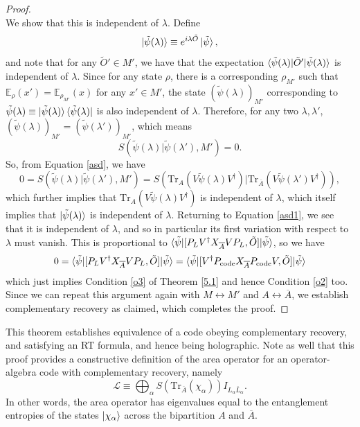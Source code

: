 \documentclass[12pt,a4paper]{report}
\numberwithin{equation}{section}
\newcommand{\ketbra}[2]{\ket{#1}\bra{#2}}
\newcommand{\ketbras}[1]{\ketbra{#1}{#1}}
\newcommand{\Pc}{P_{\text{code}}}
\newcommand{\ol}[1]{\overline{#1}}
\newcommand{\tr}{\text{Tr}}
\theoremstyle{definition}
\theoremstyle{theorem}
\theoremstyle{theorem}
\theoremstyle{example}
\theoremstyle{definition}
\begin{document}
\begin{proof}
\begin{equation}
	\end{equation}
	We show that this is independent of $\lambda$. Define
	\begin{equation}
		\ket{\tilde{\psi}(\lambda)}\equiv e^{i\lambda\tilde{O}}\ket{\tilde{\psi}},
	\end{equation}
	and note that for any $\tilde{O}'\in M'$, we have that the expectation $\braket{\tilde{\psi}(\lambda)|\tilde{O}'|\tilde{\psi}(\lambda)}$ is independent of $\lambda$. Since for any state $\rho$, there is a corresponding $\rho_{M'}$ such that $\mathbb{E}_{\rho}(x')=\mathbb{E}_{\rho_{M'}}(x)$ for any $x'\in M'$, the state $(\tilde{\psi}(\lambda))_{M'}$ corresponding to $\tilde{\psi}(\lambda)\equiv\ketbras{\tilde{\psi}(\lambda)}$ is also independent of $\lambda$. Therefore, for any two $\lambda,\lambda'$, $(\tilde{\psi}(\lambda))_{M'}=(\tilde{\psi}(\lambda'))_{M'}$, which means
	\begin{equation}
		S(\tilde{\psi}(\lambda)|\tilde{\psi}(\lambda'),M')=0.
	\end{equation}
	So, from Equation \ref{asd}, we have
	\begin{equation}
		0=S(\tilde{\psi}(\lambda)|\tilde{\psi}(\lambda'),M')=S(\tr_{{A}}(V\tilde{\psi}(\lambda) V^{\dagger})|\tr_{\ol{A}}(V\tilde{\psi}(\lambda') V^{\dagger})),
	\end{equation}
	which further implies that $\tr_{A}(V\tilde{\psi}(\lambda)V^{\dagger})$ is independent of $\lambda$, which itself implies that $\ket{\tilde{\psi}(\lambda)}$ is independent of $\lambda$. Returning to Equation \ref{asd1}, we see that it is independent of $\lambda$, and so in particular its first variation with respect to $\lambda$ must vanish. This is proportional to $\braket{\tilde{\psi}|[P_{L}V^{\dagger}X_{\ol{A}}VP_{L},\tilde{O}]|\tilde{\psi}}$, so we have
	\begin{equation}
		0=\braket{\tilde{\psi}|[P_{L}V^{\dagger}X_{\ol{A}}VP_{L},\tilde{O}]|\tilde{\psi}}=\braket{\tilde{\psi}|[V^{\dagger}\Pc X_{\ol{A}}\Pc V,\tilde{O}]|\tilde{\psi}}
	\end{equation}
	which just implies Condition \ref{o3} of Theorem \ref{5.1} and hence Condition \ref{o2} too. Since we can repeat this argument again with $M\leftrightarrow M'$ and $A\leftrightarrow \ol{A}$, we establish complementary recovery as claimed, which completes the proof.
\end{proof}
This theorem establishes equivalence of a code obeying complementary recovery, and satisfying an RT formula, and hence being holographic. Note as well that this proof provides a constructive definition of the area operator for an operator-algebra code with complementary recovery, namely
\begin{equation}
	\mathcal{L}\equiv \bigoplus_{\alpha}S\left(\tr_{\ol{A}}\left(\chi_{\alpha}\right)\right)I_{L_{\alpha}\ol{L}_{\alpha}}.
\end{equation}
In other words, the area operator has eigenvalues equal to the entanglement entropies of the states $\ket{\chi_{\alpha}}$ across the bipartition $A$ and $\ol{A}$.
\end{document}
